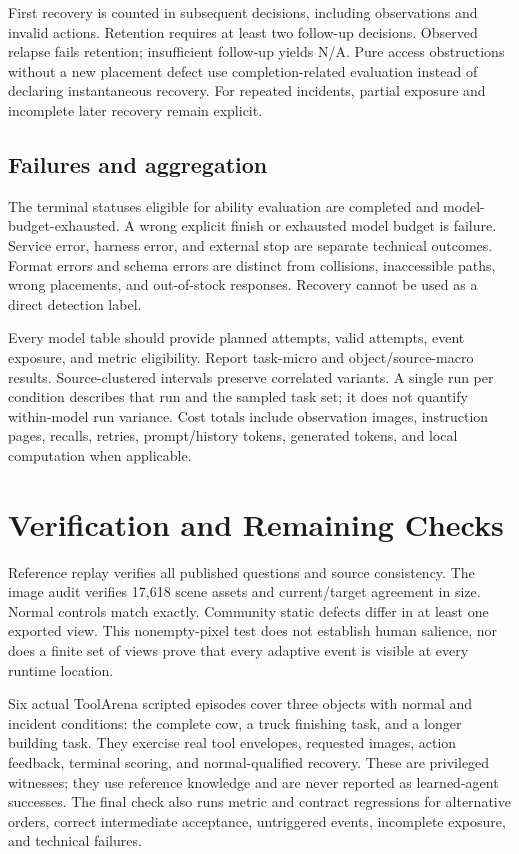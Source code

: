 \documentclass[10pt,twocolumn,letterpaper]{article}
\begin{document}
First recovery is counted in subsequent decisions, including observations and invalid actions. Retention requires at least two follow-up decisions. Observed relapse fails retention; insufficient follow-up yields N/A. Pure access obstructions without a new placement defect use completion-related evaluation instead of declaring instantaneous recovery. For repeated incidents, partial exposure and incomplete later recovery remain explicit.

\subsection{Failures and aggregation}
The terminal statuses eligible for ability evaluation are completed and model-budget-exhausted. A wrong explicit finish or exhausted model budget is failure. Service error, harness error, and external stop are separate technical outcomes. Format errors and schema errors are distinct from collisions, inaccessible paths, wrong placements, and out-of-stock responses. Recovery cannot be used as a direct detection label.

Every model table should provide planned attempts, valid attempts, event exposure, and metric eligibility. Report task-micro and object/source-macro results. Source-clustered intervals preserve correlated variants. A single run per condition describes that run and the sampled task set; it does not quantify within-model run variance. Cost totals include observation images, instruction pages, recalls, retries, prompt/history tokens, generated tokens, and local computation when applicable.

\section{Verification and Remaining Checks}
Reference replay verifies all published questions and source consistency. The image audit verifies 17,618 scene assets and current/target agreement in size. Normal controls match exactly. Community static defects differ in at least one exported view. This nonempty-pixel test does not establish human salience, nor does a finite set of views prove that every adaptive event is visible at every runtime location.

Six actual ToolArena scripted episodes cover three objects with normal and incident conditions: the complete cow, a truck finishing task, and a longer building task. They exercise real tool envelopes, requested images, action feedback, terminal scoring, and normal-qualified recovery. These are privileged witnesses; they use reference knowledge and are never reported as learned-agent successes. The final check also runs metric and contract regressions for alternative orders, correct intermediate acceptance, untriggered events, incomplete exposure, and technical failures.
\end{document}
